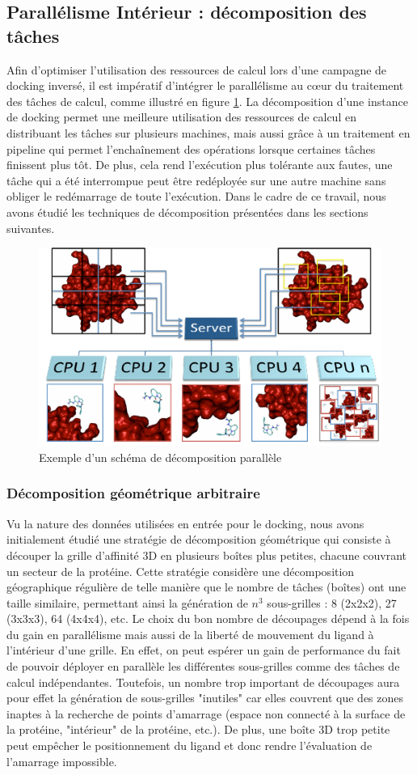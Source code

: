 \subsection{Parallélisme Intérieur : décomposition des tâches}
Afin d'optimiser l'utilisation des ressources de calcul lors d'une campagne de docking inversé, il est impératif d'intégrer le parallélisme au c{\oe}ur du traitement des tâches de calcul, comme illustré en figure \ref{fig:romain-fig1}. La décomposition d'une instance de docking permet une meilleure utilisation des ressources de calcul en distribuant les tâches sur plusieurs machines, mais aussi grâce à un traitement en pipeline qui permet l'enchaînement des opérations lorsque certaines tâches finissent plus tôt. De plus, cela rend l'exécution plus tolérante aux fautes, une tâche qui a été interrompue peut être redéployée sur une autre machine sans obliger le redémarrage de toute l'exécution. Dans le cadre de ce travail, nous avons étudié les techniques de décomposition présentées dans les sections suivantes. 

\begin{figure}
	\begin{center}
		\includegraphics[width=0.5\linewidth]{images/Romain/fig1-color}
	\end{center}
	\caption{Exemple d'un schéma de décomposition parallèle}\label{fig:romain-fig1}
\end{figure}

\subsubsection{Décomposition géométrique arbitraire}
Vu la nature des données utilisées en entrée pour le docking, nous avons initialement étudié une stratégie de décomposition géométrique qui consiste à découper la grille d'affinité 3D en plusieurs boîtes plus petites, chacune couvrant un secteur de la protéine. Cette stratégie considère une décomposition géographique régulière de telle manière que le nombre de tâches (boîtes) ont une taille similaire, permettant ainsi la génération de $n^3$ sous-grilles : 8 (2x2x2), 27 (3x3x3), 64 (4x4x4), etc. Le choix du bon nombre de découpages dépend à la fois du gain  en parallélisme mais aussi de la liberté de mouvement du ligand à l'intérieur d'une grille. 
En effet, on peut espérer un gain de performance du fait de pouvoir déployer en parallèle les différentes sous-grilles comme des tâches de calcul indépendantes. Toutefois, un nombre trop important de découpages aura pour effet la génération de sous-grilles "inutiles" car elles couvrent que des zones inaptes à la recherche de points d'amarrage (espace non connecté à la surface de la protéine, "intérieur" de la protéine, etc.). De plus, une boîte 3D trop petite peut empêcher le positionnement du ligand et donc rendre l'évaluation de l'amarrage impossible.

